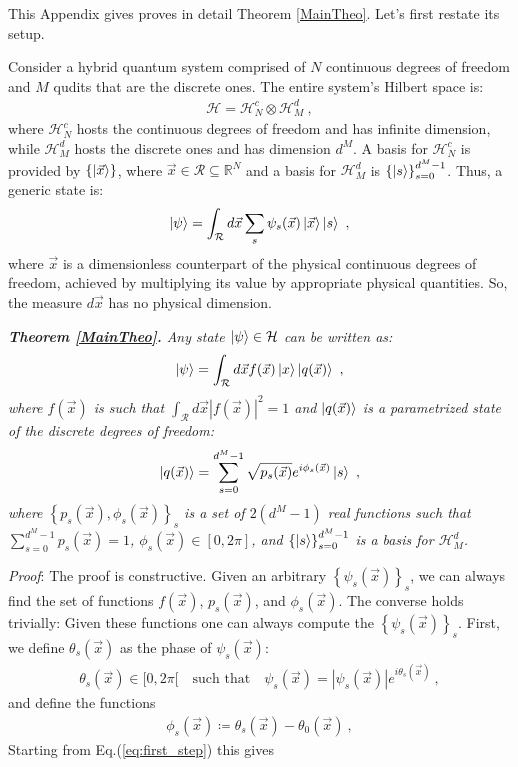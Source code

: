 \documentclass[draft,nofootinbib,pre,twocolumn,showpacs,showkeys,preprintnumbers,floatfix]{revtex4-1}
\newcommand{\1}{\mathbbm{1}}
\begin{document}
This Appendix gives proves in detail Theorem \ref{MainTheo}.
Let's first restate its setup.

Consider a hybrid quantum system comprised of $N$ continuous degrees of freedom
and $M$ qudits that are the discrete ones. The entire system's Hilbert space
is:
\begin{align*}
\mathcal{H} = \mathcal{H}^c_N \otimes \mathcal{H}^d_M
  ~,
\end{align*}
where $\mathcal{H}_N^c$ hosts the continuous degrees of freedom and has
infinite dimension, while $\mathcal{H}^d_M$ hosts the discrete ones and has
dimension $d^M$. A basis for $\mathcal{H}_N^c$ is provided by
$\left\{\ket{\vec{x}}\right\}$, where $\vec{x} \in \mathcal{R} \subseteq
\mathbb{R}^N$ and a basis for $\mathcal{H}_M^d$ is
$\left\{\ket{s}\right\}_{s=0}^{d^M-1}$. Thus, a generic state is:
\begin{align}
\ket{\psi} = \int_{\mathcal{R}} d\vec{x} \sum_{s} \psi_s(\vec{x})\ket{\vec{x}} \ket{s}
  ~,\label{eq:first_step}
\end{align}
where $\vec{x}$ is a dimensionless counterpart of the physical continuous
degrees of freedom, achieved by multiplying its value by appropriate physical
quantities. So, the measure $d\vec{x}$ has no physical dimension. 


\emph{{\bf Theorem \ref{MainTheo}.}
Any state $\ket{\psi} \in \mathcal{H}$ can be written as:
\begin{align*}
\ket{\psi} = \int_{\mathcal{R}}d\vec{x} f(\vec{x}) \ket{x}\ket{q(\vec{x})}
  ~,
\end{align*}
where $f(\vec{x})$ is such that $\int_{\mathcal{R}}d\vec{x} |f(\vec{x})|^2 = 1$
and $\ket{q(\vec{x})}$ is a parametrized state of the discrete degrees of
freedom:
\begin{align*}
\ket{q(\vec{x})}
  = \sum_{s=0}^{d^M-1} \sqrt{p_s(\vec{x})} e^{i\phi_s(\vec{x})} \ket{s}
  ~,
\end{align*}
where $\left\{ p_s(\vec{x}),\phi_s(\vec{x})\right\}_s$ is a set of $2(d^M-1)$
real functions such that $\sum_{s=0}^{d^M-1} p_s(\vec{x}) = 1$,
$\phi_s(\vec{x}) \in [0,2\pi]$, and $\left\{\ket{s}\right\}_{s=0}^{d^M-1}$ is a
basis for $\mathcal{H}_M^d$.
}

\emph{Proof}: The proof is constructive. Given an arbitrary
$\left\{ \psi_s(\vec{x}) \right\}_s$, we can always find the set of functions
$f(\vec{x})$, $p_s(\vec{x})$, and $\phi_s(\vec{x})$. The converse holds
trivially: Given these functions one can always compute the $\left\{
\psi_s(\vec{x}) \right\}_s$. First, we define $\theta_s(\vec{x})$ as
the phase of $\psi_s(\vec{x})$:
\begin{align*}
\theta_s(\vec{x}) \in [0,2\pi[ \quad \mathrm{such \,\, that} \quad \psi_s(\vec{x}) = |\psi_s(\vec{x})| e^{i\theta_s(\vec{x})} 
  ~,
\end{align*}
and define the functions
\begin{align*}
\phi_s(\vec{x}) \coloneqq \theta_s(\vec{x}) - \theta_0(\vec{x})
  ~,
\end{align*}
Starting from Eq.(\ref{eq:first_step}) this gives
\end{document}
